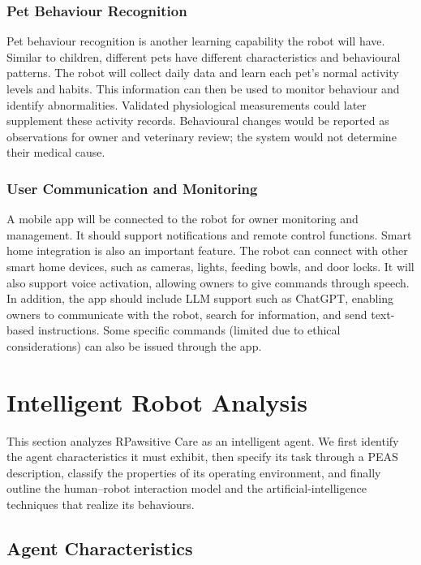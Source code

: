 \documentclass[conference,letterpaper]{IEEEtran}
\begin{document}
\subsubsection{Pet Behaviour Recognition}

Pet behaviour recognition is another learning capability the robot will have. Similar to children, different pets have different characteristics and behavioural patterns. The robot will collect daily data and learn each pet’s normal activity levels and habits. This information can then be used to monitor behaviour and identify abnormalities. Validated physiological measurements could later supplement these activity records. Behavioural changes would be reported as observations for owner and veterinary review; the system would not determine their medical cause.

\subsubsection{User Communication and Monitoring}

A mobile app will be connected to the robot for owner monitoring and management. It should support notifications and remote control functions. Smart home integration is also an important feature. The robot can connect with other smart home devices, such as cameras, lights, feeding bowls, and door locks. It will also support voice activation, allowing owners to give commands through speech. In addition, the app should include LLM support such as ChatGPT, enabling owners to communicate with the robot, search for information, and send text-based instructions. Some specific commands (limited due to ethical considerations) can also be issued through the app.

\section{Intelligent Robot Analysis}

This section analyzes RPawsitive Care as an intelligent agent. We first identify the agent characteristics it must exhibit, then specify its task through a PEAS description, classify the properties of its operating environment, and finally outline the human–robot interaction model and the artificial-intelligence techniques that realize its behaviours.

\subsection{Agent Characteristics}
\end{document}
